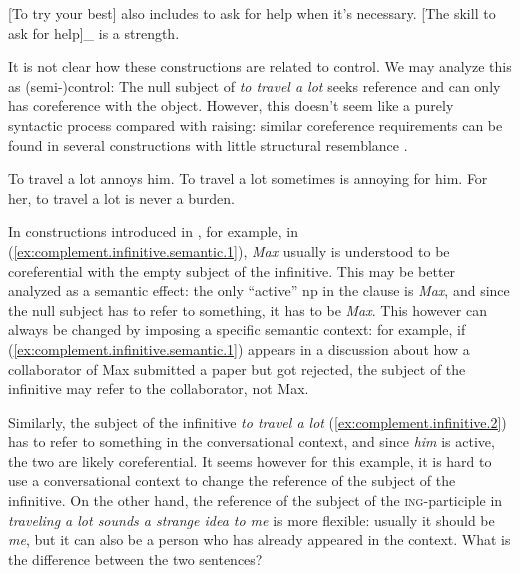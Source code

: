 \documentclass[UTF8, a4paper, oneside, scheme=plain, 12pt]{ctexbook}
\newcommand*{\citepage}[1]{p.~{#1}}
\newcommand{\form}[1]{\emph{#1}}
\newcommand{\category}[1]{\textsc{#1}}
\begin{document}
\begin{exe}
    \ex\label{ex:complement.infinitive.1} 
    [To try your best] also includes to ask for help when it's necessary.
    \ex\label{ex:complement.infinitive.1p} [The skill to ask for help]_{}
    is a strength.
\end{exe}

It is not clear how these constructions are related to control.
We may analyze this as (semi-)control:
The null subject of \form{to travel a lot} 
seeks reference and can only has coreference with the object.
However, this doesn't seem like a purely syntactic process
compared with raising:
similar coreference requirements can be found in 
several constructions with little structural resemblance
\citep[\citepage{1269}]{cgel}.

\begin{exe}
    \ex\label{ex:complement.infinitive.2}  To travel a lot annoys him.
    \ex To travel a lot sometimes is annoying for him.
    \ex For her, to travel a lot is never a burden.
\end{exe}



In constructions introduced in \citet[\citepage{1269}]{cgel},
for example, in (\ref{ex:complement.infinitive.semantic.1}),
\form{Max} usually is understood to be coreferential with 
the empty subject of the infinitive.
This may be better analyzed as a semantic effect:
the only ``active'' \acs{np} in the clause is \form{Max}, 
and since the null subject has to refer to something,
it has to be \form{Max}. 
This however can always be changed by imposing a specific semantic context:
for example, if (\ref{ex:complement.infinitive.semantic.1}) appears
in a discussion about how a collaborator of Max submitted a paper but got rejected,
the subject of the infinitive may refer to the collaborator, not Max.

Similarly, the subject of the infinitive \form{to travel a lot} (\ref{ex:complement.infinitive.2}) 
has to refer to something in the conversational context,
and since \form{him} is active, the two are likely coreferential.
It seems however for this example,
it is hard to use a conversational context to change the reference of the subject of the infinitive.
On the other hand,
the reference of the subject of the \category{ing}-participle
in \form{traveling a lot sounds a strange idea to me} is more flexible:
usually it should be \form{me},
but it can also be a person who has already appeared in the context.
What is the difference between the two sentences?
\end{document}
